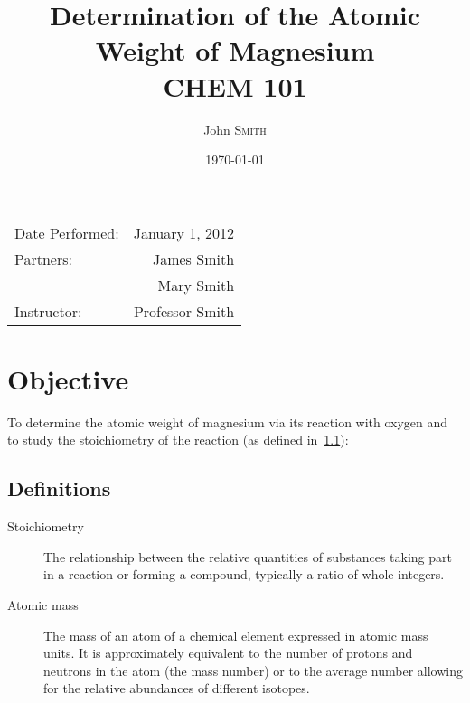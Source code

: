 \documentclass{article}
\title{Determination of the Atomic \\ Weight of Magnesium \\ CHEM 101} %
\author{John \textsc{Smith}} %
\date{\today} %
\begin{document}
\maketitle %

\begin{center}
\begin{tabular}{l r}
Date Performed: & January 1, 2012 \\ %
Partners: & James Smith \\ %
& Mary Smith \\
Instructor: & Professor Smith %
\end{tabular}
\end{center}



\section{Objective}

To determine the atomic weight of magnesium via its reaction with oxygen and to
study the stoichiometry of the reaction (as defined in~\ref{definitions}):

\begin{center}\end{center}


\subsection{Definitions}
\label{definitions}
\begin{description}
\item[Stoichiometry]
The relationship between the relative quantities of substances taking part in a
reaction or forming a compound, typically a ratio of whole integers.
\item[Atomic mass]
The mass of an atom of a chemical element expressed in atomic mass units. It is
approximately equivalent to the number of protons and neutrons in the atom (the
mass number) or to the average number allowing for the relative abundances of
different isotopes. 
\end{description} 
 
\end{document}
